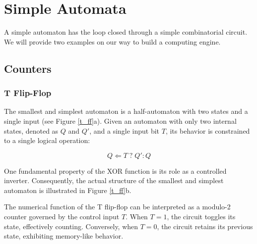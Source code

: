 \section{Simple Automata}
A simple automaton has the loop closed through a simple combinatorial circuit. We will provide two examples on our way to build a computing engine.

\subsection{Counters}

\subsubsection{T Flip-Flop}
The smallest and simplest automaton is a half-automaton with two states and a single input (see Figure \ref{t_ff}a). Given an automaton with only two internal states, denoted as \( Q \) and \( Q' \), and a single input bit \( T \), its behavior is constrained to a single logical operation:

\[
Q \Leftarrow T \;? \; Q' : Q
\]


One fundamental property of the XOR function is its role as a controlled inverter. Consequently, the actual structure of the smallest and simplest automaton is illustrated in Figure \ref{t_ff}b.

The numerical function of the T flip-flop can be interpreted as a modulo-2 counter governed by the control input \( T \). When \( T = 1 \), the circuit toggles its state, effectively counting. Conversely, when \( T = 0 \), the circuit retains its previous state, exhibiting memory-like behavior.

